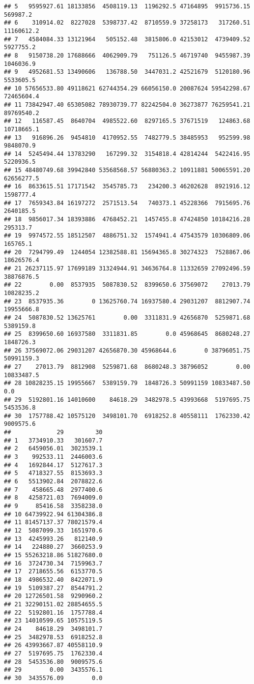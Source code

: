 \documentclass[
]{article}
\begin{document}
\begin{verbatim}
## 5   9595927.61 18133856  4508119.13  1196292.5 47164895  9915736.15   569987.2
## 6    310914.02  8227028  5398737.42  8710559.9 37258173   317260.51 11160612.2
## 7   4584084.33 13121964   505152.48  3815806.0 42153012  4739409.52  5927755.2
## 8   9150738.20 17688666  4062909.79   751126.5 46719740  9455987.39  1046036.9
## 9   4952681.53 13490606   136788.50  3447031.2 42521679  5120180.96  5533605.5
## 10 57656533.80 49118621 62744354.29 66056150.0 20087624 59542298.67 72465604.4
## 11 73842947.40 65305082 78930739.77 82242504.0 36273877 76259541.21 89769540.2
## 12   116587.45  8640704  4985522.60  8297165.5 37671519   124863.68 10718665.1
## 13   916896.26  9454810  4170952.55  7482779.5 38485953   952599.98  9848070.9
## 14  5245494.44 13783290   167299.32  3154818.4 42814244  5422416.95  5220936.5
## 15 48480749.68 39942840 53568568.57 56880363.2 10911881 50065591.20 62656277.5
## 16  8633615.51 17171542  3545785.73   234200.3 46202628  8921916.12  1598777.4
## 17  7659343.84 16197272  2571513.54   740373.1 45228366  7915695.76  2640185.5
## 18  9856017.34 18393886  4768452.21  1457455.8 47424850 10184216.28   295313.7
## 19  9974572.55 18512507  4886751.32  1574941.4 47543579 10306809.06   165765.1
## 20  7294799.49  1244054 12382588.81 15694365.8 30274323  7528867.06 18626576.4
## 21 26237115.97 17699189 31324944.91 34636764.8 11332659 27092496.59 38876876.5
## 22        0.00  8537935  5087830.52  8399650.6 37569072    27013.79 10828235.2
## 23  8537935.36        0 13625760.74 16937580.4 29031207  8812907.74 19955666.8
## 24  5087830.52 13625761        0.00  3311831.9 42656870  5259871.68  5389159.8
## 25  8399650.60 16937580  3311831.85        0.0 45968645  8680248.27  1848726.3
## 26 37569072.06 29031207 42656870.30 45968644.6        0 38796051.75 50991159.3
## 27    27013.79  8812908  5259871.68  8680248.3 38796052        0.00 10833487.5
## 28 10828235.15 19955667  5389159.79  1848726.3 50991159 10833487.50        0.0
## 29  5192801.16 14010600    84618.29  3482978.5 43993668  5197695.75  5453536.8
## 30  1757788.42 10575120  3498101.70  6918252.8 40558111  1762330.42  9009575.6
##             29         30
## 1   3734910.33   301607.7
## 2   6459056.01  3023539.1
## 3    992533.11  2446003.6
## 4   1692844.17  5127617.3
## 5   4718327.55  8153693.3
## 6   5513902.84  2078822.6
## 7    458665.48  2977400.6
## 8   4258721.03  7694009.0
## 9     85416.58  3358238.0
## 10 64739922.94 61304386.8
## 11 81457137.37 78021579.4
## 12  5087099.33  1651970.6
## 13  4245993.26   812140.9
## 14   224880.27  3660253.9
## 15 55263218.86 51827680.0
## 16  3724730.34  7159963.7
## 17  2718655.56  6153770.5
## 18  4986532.40  8422071.9
## 19  5109387.27  8544791.2
## 20 12726501.58  9290960.2
## 21 32290151.02 28854655.5
## 22  5192801.16  1757788.4
## 23 14010599.65 10575119.5
## 24    84618.29  3498101.7
## 25  3482978.53  6918252.8
## 26 43993667.87 40558110.9
## 27  5197695.75  1762330.4
## 28  5453536.80  9009575.6
## 29        0.00  3435576.1
## 30  3435576.09        0.0
\end{verbatim}
\end{document}
